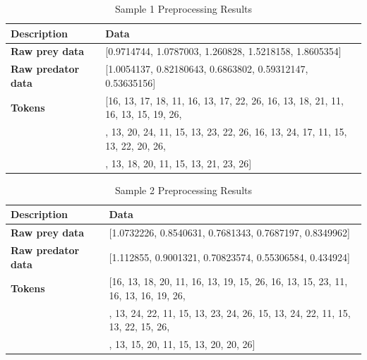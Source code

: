 \documentclass{article}
\begin{document}
\begin{table}[ht]
  \centering
  \caption{Sample 1 Preprocessing Results}
  \begin{tabular}{>{\bfseries}l l}
    \toprule
    Description & Data \\
    \midrule
    Raw prey data & [0.9714744, 1.0787003, 1.260828, 1.5218158, 1.8605354] \\
    Raw predator data & [1.0054137, 0.82180643, 0.6863802, 0.59312147, 0.53635156] \\
    Tokens  & [16, 13, 17, 18, 11, 16, 13, 17, 22, 26, 16, 13, 18, 21, 11, 16, 13, 15, 19, 26,\\ 
                & \quad 16, 13, 20, 24, 11, 15, 13, 23, 22, 26, 16, 13, 24, 17, 11, 15, 13, 22, 20, 26,\\
                & \quad 17, 13, 18, 20, 11, 15, 13, 21, 23, 26] \\
    \bottomrule
  \end{tabular}
\end{table}

\begin{table}[ht]
  \centering
  \caption{Sample 2 Preprocessing Results}
  \begin{tabular}{>{\bfseries}l l}
    \toprule
    Description & Data \\
    \midrule
    Raw prey data & [1.0732226, 0.8540631, 0.7681343, 0.7687197, 0.8349962] \\
    Raw predator data\ & [1.112855, 0.9001321, 0.70823574, 0.55306584, 0.434924] \\
    Tokens & [16, 13, 18, 20, 11, 16, 13, 19, 15, 26, 16, 13, 15, 23, 11, 16, 13, 16, 19, 26,\\ 
                & \quad 15, 13, 24, 22, 11, 15, 13, 23, 24, 26, 15, 13, 24, 22, 11, 15, 13, 22, 15, 26,\\ 
                & \quad 16, 13, 15, 20, 11, 15, 13, 20, 20, 26] \\
    \bottomrule
  \end{tabular}
\end{table}

\end{document}
